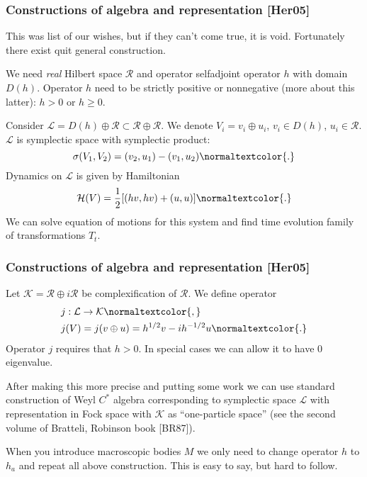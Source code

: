 \documentclass[10pt,t]{beamer}  %
\newcommand{\Hc}{\mathcal{H}}
\newcommand{\Lc}{\mathcal{L}}
\newcommand{\Rc}{\mathcal{R}}
\begin{document}
\begin{frame}
  \frametitle{Constructions of algebra and representation [Her05]}


  This was list of our wishes, but if they can't come true, it is
  void. Fortunately there exist quit general construction.

  We need \emph{real} Hilbert space $\Rc$ and operator selfadjoint
  operator $h$ with domain $D( h )$. Operator $h$ need to be strictly
  positive or nonnegative (more about this latter): $h > 0$ or
  $h \geq 0$.

  Consider $\Lc = D( h ) \oplus \Rc \subset \Rc \oplus \Rc$. We denote
  $V_{ i } = v_{ i } \oplus u_{ i }$, $v_{ i } \in D( h )$,
  $u_{ i } \in \Rc$. $\Lc$ is symplectic space with symplectic
  product:
  \begin{equation}
    \label{eq:10}
    \sigma( V_{ 1 }, V_{ 2 } )
    =
    ( v_{ 2 }, u_{ 1 } ) - ( v_{ 1 }, u_{ 2 } )\normaltextcolor{.}
  \end{equation}
  Dynamics on $\Lc$ is given by Hamiltonian
  \begin{equation}
    \label{eq:11}
    \Hc( V )
    =
    \frac{ 1 }{ 2 } [ ( h v, h v ) + ( u, u ) ]\normaltextcolor{.}
  \end{equation}
  We can solve equation of motions for this system and find time
  evolution family of transformations $T_{ t }$.

\end{frame}





\begin{frame}
  \frametitle{Constructions of algebra and representation [Her05]}


  Let $\mathcal{K} = \Rc \oplus i \Rc$ be complexification of $\Rc$.
  We define operator
  \begin{align*}
    &j: \Lc \to \mathcal{K}\normaltextcolor{,} \\
    &j( V ) = j( v \oplus u ) = h^{ 1 / 2 } v - i h^{ -1/2 } u\normaltextcolor{.}
  \end{align*}
  Operator $j$ requires that $h > 0$. In special cases we can allow it
  to have $0$ eigenvalue.

  After making this more precise and putting some work we can use
  standard construction of Weyl $C^{ * }$ algebra corresponding to
  symplectic space $\Lc$ with representation in Fock space with
  $\mathcal{K}$ as ``one-particle space'' (see the second volume of
  Bratteli, Robinson book [BR87]).

  When you introduce macroscopic bodies $M$ we only need to change
  operator $h$ to $h_{ a }$ and repeat all above construction. This is
  easy to say, but hard to follow.

\end{frame}
\end{document}
